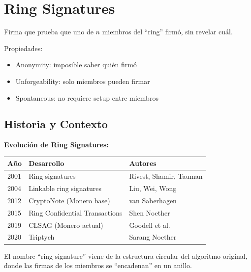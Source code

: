 \documentclass[11pt,a4paper,twoside]{book}
\begin{document}
\section{Ring Signatures}
\label{sec:ring-signatures}

\begin{definition}
Firma que prueba que uno de $n$ miembros del ``ring'' firm\'o, sin revelar cu\'al.
\end{definition}

Propiedades:
\begin{itemize}
    \item Anonymity: imposible saber qui\'en firm\'o
    \item Unforgeability: solo miembros pueden firmar
    \item Spontaneous: no requiere setup entre miembros
\end{itemize}

\subsection{Historia y Contexto}

\begin{remark}
\textbf{Evoluci\'on de Ring Signatures:}

\begin{center}
\begin{tabular}{lll}
\toprule
\textbf{A\~no} & \textbf{Desarrollo} & \textbf{Autores} \\
\midrule
2001 & Ring signatures & Rivest, Shamir, Tauman \\
2004 & Linkable ring signatures & Liu, Wei, Wong \\
2012 & CryptoNote (Monero base) & van Saberhagen \\
2015 & Ring Confidential Transactions & Shen Noether \\
2019 & CLSAG (Monero actual) & Goodell et al. \\
2020 & Triptych & Sarang Noether \\
\bottomrule
\end{tabular}
\end{center}

El nombre ``ring signature'' viene de la estructura circular del algoritmo original, donde las firmas de los miembros se ``encadenan'' en un anillo.
\end{remark}
\end{document}
